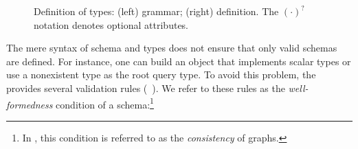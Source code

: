 \begin{figure}[h]
\begin{subfigure}{.5\textwidth}
    \end{subfigure}
    \caption{Definition of \gql types: (left) \spec grammar; 
    (right) \gcoql definition.\newline
    {\footnotesize The $(\cdot)^{?}$ notation denotes optional attributes.} 
    }
    \label{fig:types_def}
\end{figure}




The mere syntax of schema and types does not ensure that only valid schemas are defined. For instance, one can build
an object that implements scalar types or use a nonexistent type as
the root query type. To avoid this problem, the \spec provides several
validation rules (\cf~\cite[\S3]{gqlspec}). %
We refer to these rules as the \textit{well-formedness}
condition of a \gql schema:\footnote{In \HP, this condition is
  referred to as the {\em consistency} of graphs.}

